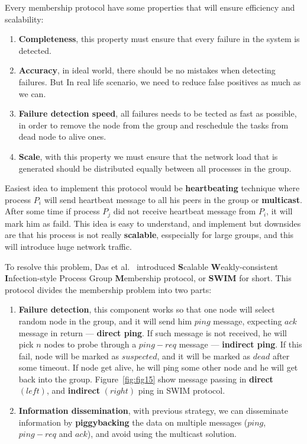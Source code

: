 Every membership protocol have some properties that will ensure efficiency and scalability:

\begin{enumerate}[start=1,label={(\bfseries \arabic*)}] \label{ds:features}
	\item \textbf{Completeness}, this property must ensure that every failure in the system is detected.
	\item \textbf{Accuracy}, in ideal world, there should be no mistakes when detecting failures. But In real life scenario, we need to reduce false positives as much as we can.
	\item \textbf{Failure detection speed}, all failures needs to be tected as fast as possible, in order to remove the node from the group and reschedule the tasks from dead node to alive ones.
	\item \textbf{Scale}, with this property we must ensure that the network load that is generated should be distributed equally between all processes in the group.
\end{enumerate}

Easiest idea to implement this protocol would be \textbf{heartbeating} technique where process $P_i$ will send heartbeat message to all his peers in the group or \textbf{multicast}. After some time if process $P_j$ did not receive heartbeat message from $P_i$, it will mark him as faild. This idea is easy to understand, and implement but downsides are that his process is not really \textbf{scalable}, esspecially for large groups, and this will introduce huge network traffic.

To resolve this problem, Das et al.~\cite{DasGM02} introduced \textbf{S}calable \textbf{W}eakly-consistent \textbf{I}nfection-style Process Group \textbf{M}embership protocol, or \textbf{SWIM} for short. This protocol divides the membership problem into two parts:

\begin{enumerate}[start=1,label={(\bfseries \arabic*)}]
	\item \textbf{Failure detection}, this component works so that one node will select random node in the group, and it will send him $ping$ message, expecting $ack$ message in return --- \textbf{direct ping}. If such message is not received, he will pick $n$ nodes to probe through a $ping-req$ message --- \textbf{indirect ping}. If this fail, node will be marked as $suspected$, and it will be marked as $dead$ after some timeout. If node get alive, he will ping some other node and he will get back into the group. Figure~\ref{fig:fig15} show message passing in \textbf{direct} $(left)$, and \textbf{indirect} $(right)$ ping in SWIM protocol.
	\item \textbf{Information dissemination}, with previous strategy, we can disseminate information by \textbf{piggybacking} the data on multiple messages ($ping$, $ping-req$ and $ack$), and avoid using the multicast solution.
\end{enumerate}

